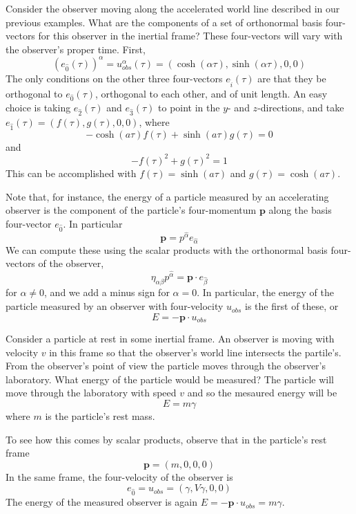 \begin{eg}
    Consider the observer moving along the accelerated world line described in our previous examples. What are the components of a set of orthonormal basis four-vectors for this observer in the inertial frame? These four-vectors will vary with the observer's proper time. First, $$(e_{\hat{0}}(\tau))^{\alpha} = u_{obs}^{\alpha}(\tau) = (\cosh(\alpha \tau),\sinh(\alpha \tau),0,0)$$
    The only conditions on the other three four-vectors $e_{\hat{i}}(\tau)$ are that they be orthogonal to $e_{\hat{0}}(\tau)$, orthogonal to each other, and of unit length. An easy choice is taking $e_{\hat{2}}(\tau)$ and $e_{\hat{3}}(\tau)$ to point in the $y$- and $z$-directions, and take $e_{\hat{1}}(\tau) = (f(\tau),g(\tau),0,0)$, where $$-\cosh(a\tau)f(\tau)+\sinh(a\tau)g(\tau) = 0$$
    and $$-f(\tau)^2+g(\tau)^2 = 1$$
    This can be accomplished with $f(\tau) = \sinh(a\tau)$ and $g(\tau) = \cosh(a\tau)$.
\end{eg}

Note that, for instance, the energy of a particle measured by an accelerating observer is the component of the particle's four-momentum $\mathbf{p}$ along the basis four-vector $e_{\hat{0}}$. In particular $$\mathbf{p} = p^{\hat{\alpha}}e_{\hat{\alpha}}$$
We can compute these using the scalar products with the orthonormal basis four-vectors of the observer, $$\eta_{\alpha\beta}p^{\hat{\alpha}} = \mathbf{p}\cdot e_{\hat{\beta}}$$
for $\alpha \neq 0$, and we add a minus sign for $\alpha = 0$. In particular, the energy of the particle measured by an observer with four-velocity $u_{obs}$ is the first of these, or $$E = -\mathbf{p}\cdot u_{obs}$$

\begin{eg}
    Consider a particle at rest in some inertial frame. An observer is moving with velocity $v$ in this frame so that the observer's world line intersects the partile's. From the observer's point of view the particle moves through the observer's laboratory. What energy of the particle would be measured? The particle will move through the laboratory with speed $v$ and so the mesaured energy will be $$E = m\gamma$$
    where $m$ is the particle's rest mass.

    To see how this comes by scalar products, observe that in the particle's rest frame $$\mathbf{p} = (m,0,0,0)$$
    In the same frame, the four-velocity of the observer is $$e_{\hat{0}} = u_{obs} = (\gamma,V\gamma,0,0)$$
    The energy of the measured observer is again $E = -\mathbf{p}\cdot u_{obs} = m\gamma$.
\end{eg}


